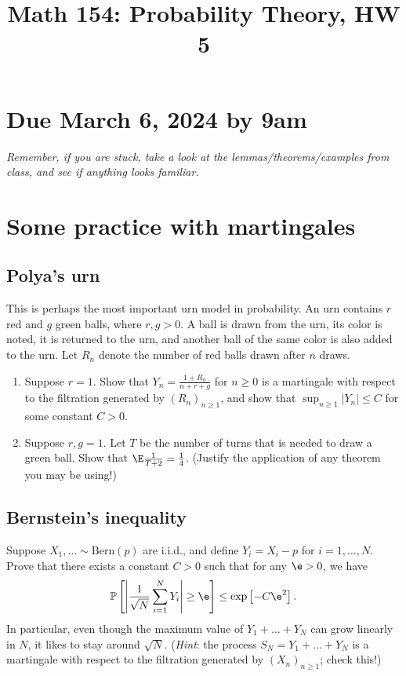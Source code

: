 \documentclass[12pt,reqno]{amsart}
\title{\Large Math 154: Probability Theory, HW 5\vspace{-0.1cm}}
\theoremstyle{definition}
\theoremstyle{remark}
\numberwithin{equation}{section}
\newenvironment{nouppercase}{%
  \let\uppercase\relax%
  \renewcommand{\uppercasenonmath}[1]{}}{}
\begin{document}
\begin{nouppercase}
\maketitle
\end{nouppercase}
\section*{Due March 6, 2024 by 9am}
\emph{Remember, if you are stuck, take a look at the lemmas/theorems/examples from class, and see if anything looks familiar.}
\section{Some practice with martingales}
\subsection{Polya's urn}
This is perhaps the most important urn model in probability. An urn contains $r$ red and $g$ green balls, where $r,g>0$. A ball is drawn from the urn, its color is noted, it is returned to the urn, and another ball of the same color is also added to the urn. Let $R_{n}$ denote the number of red balls {\color{red}drawn} after $n$ draws.
\begin{enumerate}
\item Suppose $r=1$. Show that $Y_{n}=\frac{1+R_{n}}{n+r+g}$ for $n\geq0$ is a martingale with respect to the filtration generated by $(R_{n})_{n\geq1}$, and show that $\sup_{n\geq1}|Y_{n}|\leq C$ for some constant $C>0$.
\item Suppose $r,g=1$. Let $T$ be the number of turns that is needed to draw a green ball. Show that $\E\frac{1}{T+2}=\frac14$. (Justify the application of any theorem you may be using!)
\end{enumerate}
\subsection{Bernstein's inequality}\label{subsection:bernstein}
Suppose $X_{1},\ldots\sim\mathrm{Bern}(p)$ are i.i.d., and define $Y_{i}=X_{i}-p$ for $i=1,\ldots,N$. Prove that there exists a constant $C>0$ such that for any $\e>0$, we have 
%
\begin{align*}
\mathbb{P}\left[\left|\frac{1}{\sqrt{N}}\sum_{i=1}^{N}Y_{i}\right|\geq \e\right]\leq \exp\left[-C\e^{2}\right].
\end{align*}
%
In particular, even though the maximum value of $Y_{1}+\ldots+Y_{N}$ can grow linearly in $N$, it likes to stay around $\sqrt{N}$. (\emph{Hint}: the process $S_{N}=Y_{1}+\ldots+Y_{N}$ is a martingale with respect to the filtration generated by $(X_{n})_{n\geq1}$; check this!)
\end{document}
